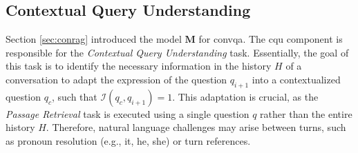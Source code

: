 








\subsection{Contextual Query Understanding}
\label{subsec:cqu}

Section \ref{sec:conrag} introduced the model $\mathbf{M}$ for \gls{convqa}. The \gls{cqu} component is responsible for the \textit{Contextual Query Understanding} task. Essentially, the goal of this task is to identify the necessary information in the history $H$ of a conversation to adapt the expression of the question $q_{i+1}$ into a contextualized question $q_c$, such that $\mathcal{I}(q_c, q_{i+1}) = 1$. This adaptation is crucial, as the \textit{Passage Retrieval} task is executed using a single question $q$ rather than the entire history $H$. Therefore, natural language challenges may arise between turns, such as pronoun resolution (e.g., it, he, she) or turn references.

